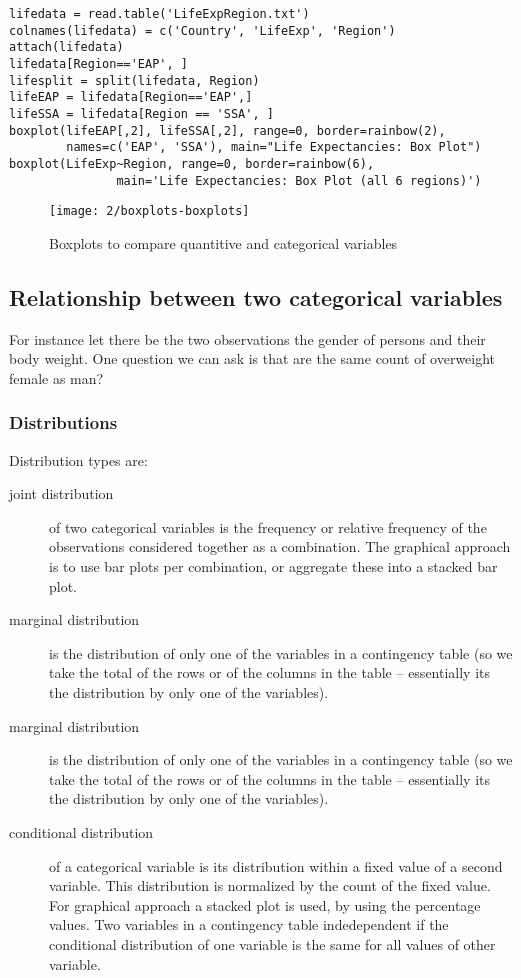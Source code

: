 \begin{verbatim}
lifedata = read.table('LifeExpRegion.txt')
colnames(lifedata) = c('Country', 'LifeExp', 'Region')
attach(lifedata)
lifedata[Region=='EAP', ]
lifesplit = split(lifedata, Region)
lifeEAP = lifedata[Region=='EAP',]
lifeSSA = lifedata[Region == 'SSA', ]
boxplot(lifeEAP[,2], lifeSSA[,2], range=0, border=rainbow(2), 
        names=c('EAP', 'SSA'), main="Life Expectancies: Box Plot")
boxplot(LifeExp~Region, range=0, border=rainbow(6), 
               main='Life Expectancies: Box Plot (all 6 regions)')
\end{verbatim}

\begin{figure}[htbp]
\label{fig:boxplots}
\caption{Boxplots to compare quantitive and categorical variables}
\texttt{[image: 2/boxplots-boxplots]}
\end{figure}

\subsection{Relationship between two categorical variables}

For instance let there be the two observations the gender of persons and their
body weight. One question we can ask is that are the same count of overweight
female as man?

\subsubsection{Distributions}

Distribution types are:

\begin{description}
  \item[joint distribution] of two categorical variables is the frequency or
  relative frequency of the observations considered together as a combination.
  The graphical approach is to use bar plots per combination, or aggregate these
  into a stacked bar plot.
  \item[marginal distribution] is the distribution of only one of the variables
  in a contingency table (so we take the total of the rows or of the columns in
  the table -- essentially its the distribution by only one of the variables).
  \item[marginal distribution] is the distribution of only one of the variables
  in a contingency table (so we take the total of the rows or of the columns in
  the table -- essentially its the distribution by only one of the variables).
  \item[conditional distribution] of a categorical variable is its distribution
  within a fixed value of a second variable. This distribution is normalized by
  the count of the fixed value. For graphical approach a stacked plot is used,
  by using the percentage values. Two variables in a contingency table
  indedependent if the conditional distribution of one variable is the same for
  all values of other variable.
 \end{description}

